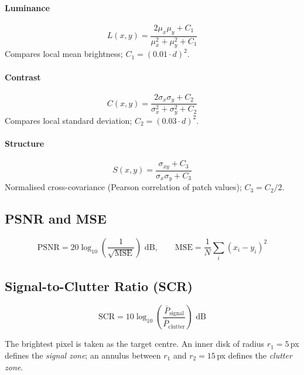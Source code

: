 \documentclass[12pt]{article}
\begin{document}
\paragraph{Luminance}
\begin{equation}
    L(x,y) = \frac{2\mu_x\mu_y + C_1}{\mu_x^2 + \mu_y^2 + C_1}
\end{equation}
Compares local mean brightness; $C_1 = (0.01 \cdot d)^2$.

\paragraph{Contrast}
\begin{equation}
    C(x,y) = \frac{2\sigma_x\sigma_y + C_2}{\sigma_x^2 + \sigma_y^2 + C_2}
\end{equation}
Compares local standard deviation; $C_2 = (0.03 \cdot d)^2$.

\paragraph{Structure}
\begin{equation}
    S(x,y) = \frac{\sigma_{xy} + C_3}{\sigma_x\sigma_y + C_3}
\end{equation}
Normalised cross-covariance (Pearson correlation of patch values); $C_3 = C_2/2$.

\subsection{PSNR and MSE}

\begin{equation}
    \text{PSNR} = 20\log_{10}\!\left(\frac{1}{\sqrt{\text{MSE}}}\right) \text{ dB},
    \qquad
    \text{MSE} = \frac{1}{N}\sum_i (x_i - y_i)^2
\end{equation}

\subsection{Signal-to-Clutter Ratio (SCR)}

\begin{equation}
    \text{SCR} = 10\log_{10}\!\left(\frac{\bar{P}_{\text{signal}}}{\bar{P}_{\text{clutter}}}\right) \text{ dB}
\end{equation}

The brightest pixel is taken as the target centre. An inner disk of radius
$r_1 = 5$\,px defines the \emph{signal zone}; an annulus between $r_1$ and
$r_2 = 15$\,px defines the \emph{clutter zone}.
\end{document}
